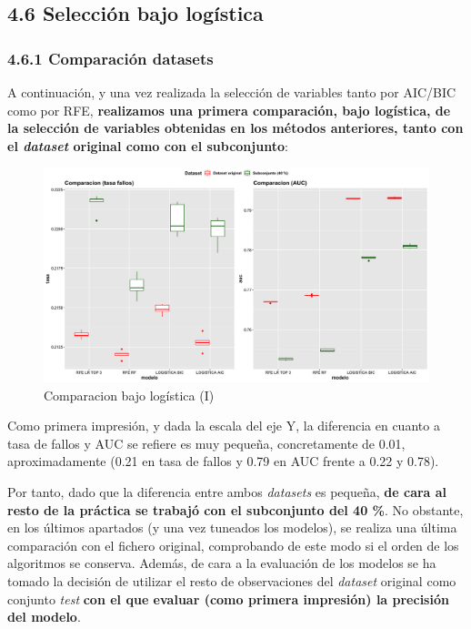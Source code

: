 \documentclass[
]{article}
\begin{document}
\hypertarget{selecciuxf3n-bajo-loguxedstica}{%
\subsection{4.6 Selección bajo
logística}\label{selecciuxf3n-bajo-loguxedstica}}

\hypertarget{comparaciuxf3n-datasets}{%
\subsubsection{4.6.1 Comparación
datasets}\label{comparaciuxf3n-datasets}}

A continuación, y una vez realizada la selección de variables tanto por
AIC/BIC como por RFE, \textbf{realizamos una primera comparación, bajo
logística, de la selección de variables obtenidas en los métodos
anteriores, tanto con el \emph{dataset} original como con el
subconjunto}:

\begin{figure}[h!]

{\centering \includegraphics[width=0.99\linewidth,height=0.99\textheight,]{./charts/01_feature_selection_primera_comparacion} 

}

\caption{Comparacion bajo logística (I)}\label{fig:unnamed-chunk-37}
\end{figure}

Como primera impresión, y dada la escala del eje Y, la diferencia en
cuanto a tasa de fallos y AUC se refiere es muy pequeña, concretamente
de 0.01, aproximadamente (0.21 en tasa de fallos y 0.79 en AUC frente a
0.22 y 0.78).

Por tanto, dado que la diferencia entre ambos \emph{datasets} es
pequeña, \textbf{de cara al resto de la práctica se trabajó con el
subconjunto del 40 \%}. No obstante, en los últimos apartados (y una vez
tuneados los modelos), se realiza una última comparación con el fichero
original, comprobando de este modo si el orden de los algoritmos se
conserva. Además, de cara a la evaluación de los modelos se ha tomado la
decisión de utilizar el resto de observaciones del \emph{dataset}
original como conjunto \emph{test} \textbf{con el que evaluar (como
primera impresión) la precisión del modelo}.
\end{document}
